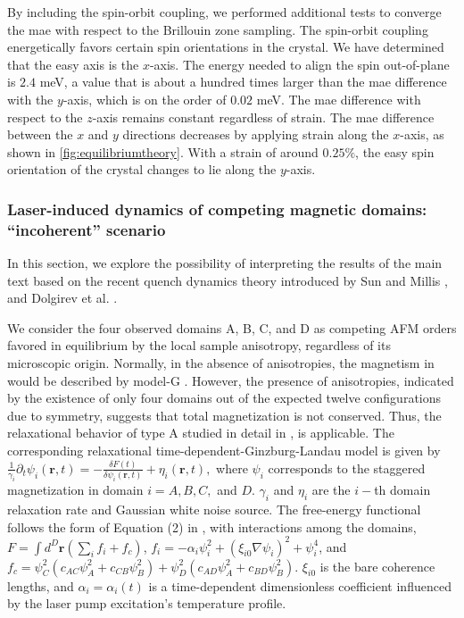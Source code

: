 By including the spin-orbit coupling, we performed additional tests to converge the \gls{mae} with respect to the Brillouin zone sampling.
The spin-orbit coupling energetically favors certain spin orientations in the crystal.
We have determined that the  easy axis is the $x$-axis.
The energy needed to align the spin out-of-plane is $2.4$ \si{meV}, a value that is about a hundred times larger than the \gls{mae} difference with the $y$-axis, which is on the order of $0.02$ \si{meV}.
The \gls{mae} difference with respect  to the $z$-axis remains constant regardless of strain.
The \gls{mae} difference between the $x$ and $y$ directions decreases by applying strain along the $x$-axis, as shown in \cref{fig:equilibriumtheory}.
With a strain of around $0.25 \%$, the easy spin orientation of the crystal changes to lie along the $y$-axis.

\subsubsection{Laser-induced dynamics of competing magnetic domains: ``incoherent'' scenario}\label{sec:fluctuations}

In this section, we explore the possibility of interpreting the results of the main text based on the recent quench dynamics theory introduced by Sun and Millis \citep{sun_transient_2020}, and Dolgirev et al. \citep{dolgirev_self-similar_2020}.  

We consider the four observed domains A, B, C, and D as competing AFM orders favored in equilibrium by the local sample anisotropy, regardless of its microscopic origin.
Normally, in the absence of anisotropies, the magnetism in \cmb would be described by model-G \citep{hohenberg1977}.
However, the presence of anisotropies, indicated by the existence of only four domains out of the expected twelve configurations due to symmetry, suggests that total magnetization is not conserved.
Thus, the relaxational behavior of type A studied in detail in \citep{sun_transient_2020,dolgirev_self-similar_2020}, is applicable.
The corresponding relaxational time-dependent-Ginzburg-Landau model is given by $\frac{1}{\gamma_i} \partial_t \psi_i(\mathbf{r}, t)=-\frac{\delta F(t)}{\delta \psi_i(\mathbf{r}, t)}+\eta_i(\mathbf{r}, t),$ where $\psi_i$ corresponds to the staggered magnetization in domain $i=A,B,C,$ and $D.$ $\gamma_i$ and $\eta_i$ are the $i-$th domain relaxation rate and Gaussian white noise source.
The free-energy functional follows the form of Equation (2) in \citep{sun_transient_2020}, with interactions among the domains, $F = \int d^D\mathbf{r} \left(\sum_i f_i+f_c \right)$, $f_i=-\alpha_i \psi_i^2+\left(\xi_{i 0} \nabla \psi_i\right)^2+\psi_i^4$, and $f_c =   \psi^2_C (c_{AC}\psi^2_A+c_{CB}\psi^2_B) + \psi^2_D (c_{AD}\psi^2_A+c_{BD}\psi^2_B)$.
$\xi_{i 0}$ is the bare coherence lengths, and $\alpha_i = \alpha_i(t)$ is a time-dependent dimensionless coefficient influenced by the laser pump excitation's temperature profile.

